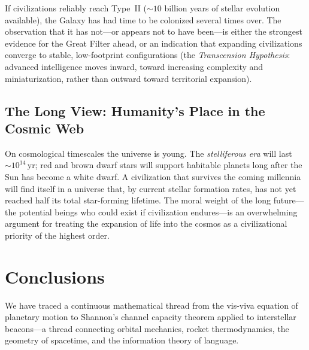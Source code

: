 \documentclass[12pt,a4paper]{article}
\begin{document}
If civilizations reliably reach Type~II ($\sim\!10$ billion years of stellar
evolution available), the Galaxy has had time to be colonized several times
over. The observation that it has not---or appears not to have been---is either
the strongest evidence for the Great Filter ahead, or an indication that
expanding civilizations converge to stable, low-footprint configurations
(the \emph{Transcension Hypothesis}: advanced intelligence moves inward, toward
increasing complexity and miniaturization, rather than outward toward territorial
expansion).

\subsection{The Long View: Humanity's Place in the Cosmic Web}

On cosmological timescales the universe is young. The \emph{stelliferous era}
will last~$\sim\!10^{14}$\,yr; red and brown dwarf stars will support
habitable planets long after the Sun has become a white dwarf. A civilization
that survives the coming millennia will find itself in a universe that, by
current stellar formation rates, has not yet reached half its total
star-forming lifetime. The moral weight of the long future---the potential
beings who could exist if civilization endures---is an overwhelming argument
for treating the expansion of life into the cosmos as a civilizational
priority of the highest order.

\section{Conclusions}

We have traced a continuous mathematical thread from the vis-viva equation of
planetary motion to Shannon's channel capacity theorem applied to interstellar
beacons---a thread connecting orbital mechanics, rocket thermodynamics, the
geometry of spacetime, and the information theory of language.
\end{document}
